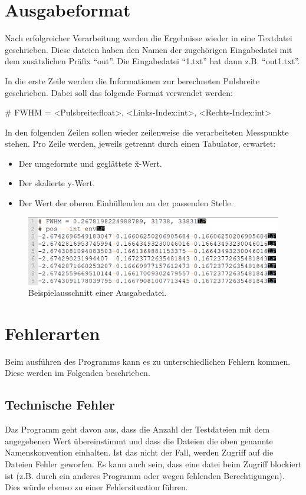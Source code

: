 \section{Ausgabeformat}\label{sec:ausgabeformat}
Nach erfolgreicher Verarbeitung werden die Ergebnisse wieder in eine Textdatei geschrieben.
Diese dateien haben den Namen der zugehörigen Eingabedatei mit dem zusätzlichen Präfix \enquote{out}.
Die Eingabedatei \enquote{1.txt} hat dann z.B. \enquote{out1.txt}.

In die erste Zeile werden die Informationen zur berechneten Pulsbreite geschrieben.
Dabei soll das folgende Format verwendet werden:
\begin{center}
    \# FWHM = <Pulsbreite:float>, <Links-Index:int>, <Rechts-Index:int>
\end{center}
In den folgenden Zeilen sollen wieder zeilenweise die verarbeiteten Messpunkte stehen.
Pro Zeile werden, jeweils getrennt durch einen Tabulator, erwartet:
\begin{itemize}[noitemsep]
    \item Der umgeformte und geglättete \~x-Wert.
    \item Der skalierte y-Wert.
    \item Der Wert der oberen Einhüllenden an der passenden Stelle.
\end{itemize}

\begin{figure}[htb]
    \centering
    \includegraphics[width=\linewidth]{images/ausgabeDat_bsp}
    \caption{
        Beispielausschnitt einer Ausgabedatei.
    }
    \label{fig:ausgabe_dat_beispiel}
\end{figure}

\section{Fehlerarten}\label{sec:fehlerarten}
Beim ausführen des Programms kann es zu unterschiedlichen Fehlern kommen.
Diese werden im Folgenden beschrieben.

\subsection{Technische Fehler}\label{subsec:technische-fehler}
Das Programm geht davon aus, dass die Anzahl der Testdateien mit dem angegebenen Wert übereinstimmt und dass die Dateien die oben genannte Namenskonvention einhalten.
Ist das nicht der Fall, werden Zugriff auf die Dateien Fehler geworfen.
Es kann auch sein, dass eine datei beim Zugriff blockiert ist (z.B. durch ein anderes Programm oder wegen fehlenden Berechtigungen).
Dies würde ebenso zu einer Fehlersituation führen.

